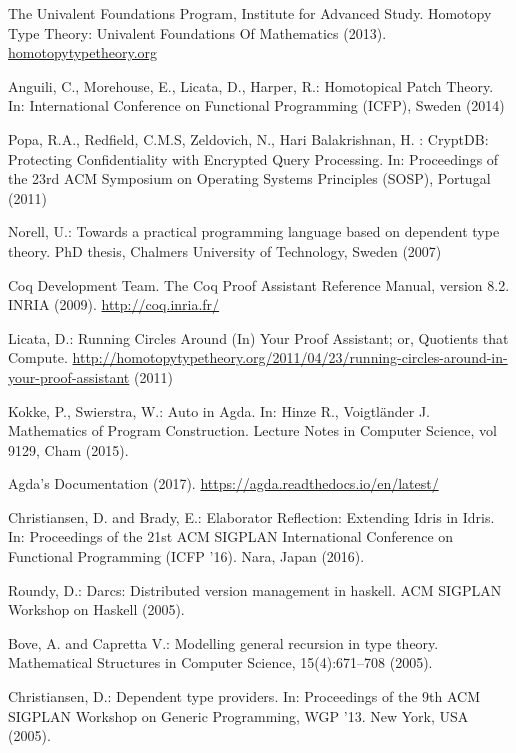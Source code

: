 \documentclass[runningheads]{llncs}
\begin{document}
\begin{thebibliography}{4}

 The Univalent Foundations Program, Institute for Advanced Study.
Homotopy Type Theory: Univalent Foundations Of Mathematics (2013). \url{homotopytypetheory.org}

 Anguili, C., Morehouse, E., Licata, D., Harper, R.: Homotopical Patch Theory. In: International Conference on Functional Programming (ICFP), Sweden (2014)

 Popa, R.A., Redfield, C.M.S, Zeldovich, N., Hari Balakrishnan, H. : CryptDB: Protecting Confidentiality with Encrypted Query Processing. In: Proceedings of the 23rd ACM Symposium on Operating Systems Principles (SOSP), Portugal (2011)

 Norell, U.: Towards a practical programming language based on dependent type theory. PhD thesis, Chalmers University of Technology, Sweden (2007)

 Coq Development Team. The Coq Proof Assistant Reference Manual,
version 8.2. INRIA (2009). \url{http://coq.inria.fr/}

 Licata, D.: Running Circles Around (In) Your Proof Assistant; or, Quotients that Compute. \url{http://homotopytypetheory.org/2011/04/23/running-circles-around-in-your-proof-assistant} (2011)

 Kokke, P., Swierstra, W.: Auto in Agda. In: Hinze R., Voigtländer J. Mathematics of Program Construction. Lecture Notes in Computer Science, vol 9129, Cham (2015).

 Agda's Documentation (2017). \url{https://agda.readthedocs.io/en/latest/}

 Christiansen, D. and Brady, E.: Elaborator Reflection: Extending Idris in Idris. In: Proceedings of the 21st ACM SIGPLAN International Conference on Functional Programming (ICFP ’16). Nara, Japan (2016).

 Roundy, D.: Darcs: Distributed version management in haskell. ACM SIGPLAN Workshop on Haskell (2005). 

 Bove, A. and Capretta V.: Modelling general recursion in type theory. Mathematical Structures in Computer Science, 15(4):671–708 (2005).

 Christiansen, D.: Dependent type providers. In: Proceedings of the 9th ACM SIGPLAN Workshop on Generic Programming, WGP ’13. New York, USA (2005).


\end{thebibliography}
\end{document}
